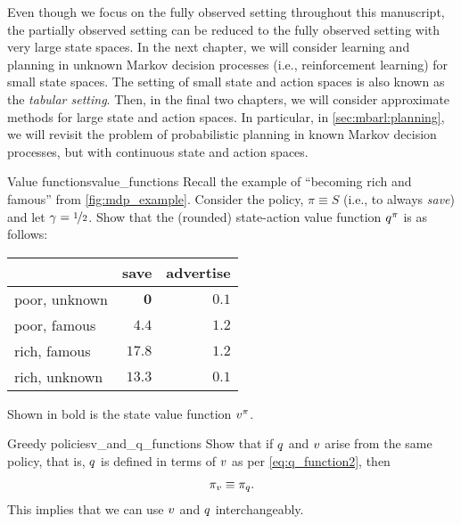 Even though we focus on the fully observed setting throughout this manuscript, the partially observed setting can be reduced to the fully observed setting with very large state spaces.
In the next chapter, we will consider learning and planning in unknown Markov decision processes (i.e., reinforcement learning) for small state spaces.
The setting of small state and action spaces is also known as the \emph{tabular setting}.
Then, in the final two chapters, we will consider approximate methods for large state and action spaces.
In particular, in \cref{sec:mbarl:planning}, we will revisit the problem of probabilistic planning in known Markov decision processes, but with continuous state and action spaces.

\excheading

\begin{nexercise}{Value functions}{value_functions}
  Recall the example of ``becoming rich and famous'' from \cref{fig:mdp_example}.
  Consider the policy, $\pi \equiv S$ (i.e., to always \emph{save}) and let $\gamma = \nicefrac{1}{2}$. Show that the (rounded) state-action value function $\fnq[\pi]$ is as follows:

  \vspace{5pt}
  \begin{center}
    \begin{tabular}{lrr}
      \toprule
      & save & advertise \\
      \midrule
      poor, unknown & $\mathbf{0}$ & $0.1$ \\
      poor, famous & $\mathbf{4.4}$ & $1.2$ \\
      rich, famous & $\mathbf{17.8}$ & $1.2$ \\
      rich, unknown & $\mathbf{13.3}$ & $0.1$ \\
      \bottomrule
    \end{tabular}
  \end{center}
  \vspace{5pt}

  Shown in bold is the state value function $\fnv[\pi]$.
\end{nexercise}

\begin{nexercise}{Greedy policies}{v_and_q_functions}
  Show that if $\fnq$ and $\fnv$ arise from the same policy, that is, $\fnq$ is defined in terms of $\fnv$ as per \cref{eq:q_function2}, then \begin{align}
    \pi_{\fnv} \equiv \pi_{\fnq}.
  \end{align}
  This implies that we can use $\fnv$ and $\fnq$ interchangeably.
\end{nexercise}

